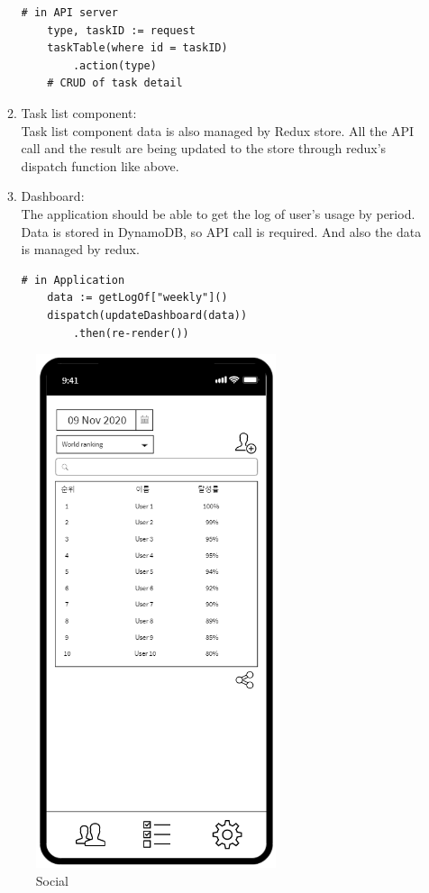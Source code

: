 \documentclass[conference]{IEEEtran}
\begin{document}
\begin{enumerate}
\begin{enumerate}
    \begin{lstlisting}[frame=single]
    # in API server
    type, taskID := request
    taskTable(where id = taskID)
        .action(type)
    # CRUD of task detail
    \end{lstlisting}
        \item Task list component: \\
        Task list component data is also managed by Redux store. All the API call and the result are being updated to the store through redux's dispatch function like above.

        \item Dashboard: \\
        The application should be able to get the log of user's usage by period. Data is stored in DynamoDB, so API call is required. And also the data is managed by redux.
    \begin{lstlisting}[frame=single]
    # in Application
    data := getLogOf["weekly"]()
    dispatch(updateDashboard(data))
        .then(re-render())
    \end{lstlisting}
\end{enumerate}
    
\begin{figure}[htp] \centering \includegraphics[width=200pt]{4) Social.PNG} \caption{Social} \label{fig:Social} \end{figure}
    

\end{enumerate}
\end{document}
